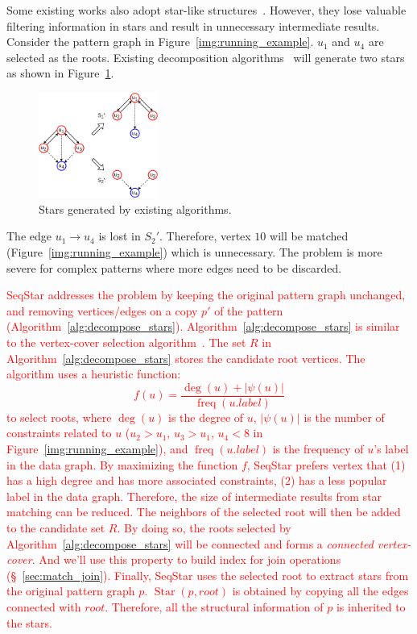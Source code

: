 
Some existing works also adopt star-like structures~\cite{DBLP:journals/pvldb/SunWWSL12,DBLP:journals/pvldb/LaiQLC15}. However, they lose valuable filtering information in stars and result in unnecessary intermediate results.
Consider the pattern graph in Figure~\ref{img:running_example}. $u_1$ and $u_4$ are selected as the roots.
Existing decomposition algorithms~\cite{DBLP:journals/pvldb/SunWWSL12,DBLP:journals/pvldb/LaiQLC15} will generate two stars as shown in Figure~\ref{img:stwig}.
\begin{figure}[ht]
  \centering
  \includegraphics[width=0.35\textwidth]{img/stwig.pdf}
  \caption{Stars generated by existing algorithms.}\label{img:stwig}
\end{figure}
The edge $u_1 \rightarrow u_4$ is lost in $S_2'$.
Therefore, vertex $10$ will be matched (Figure~\ref{img:running_example}) which is unnecessary.
The problem is more severe for complex patterns where more edges need to be discarded.

\textcolor{red}{SeqStar addresses the problem by keeping the original pattern graph unchanged, and removing vertices/edges on a copy $p'$ of the pattern (Algorithm~\ref{alg:decompose_stars}).
Algorithm~\ref{alg:decompose_stars} is similar to the vertex-cover selection algorithm~\cite{DBLP:books/daglib/0023376}.
The set $R$ in Algorithm~\ref{alg:decompose_stars} stores the candidate root vertices.
The algorithm uses a heuristic function: \[f(u) = \frac{\deg(u) + |\psi(u)|}{\operatorname{freq}(u.label)}\] to select roots,
where $\deg(u)$ is the degree of $u$, $|\psi(u)|$ is the number of constraints related to $u$ ($u_2 > u_1$, $u_3 > u_1$, $u_4 < 8$ in Figure~\ref{img:running_example}),
and $\operatorname{freq}(u.label)$ is the frequency of $u$'s label in the data graph.
By maximizing the function $f$,
SeqStar prefers vertex that
(1) has a high degree and has more associated constraints,
(2) has a less popular label in the data graph.
Therefore, the size of intermediate results from star matching can be reduced.
The neighbors of the selected root will then be added to the candidate set $R$.
By doing so, the roots selected by Algorithm~\ref{alg:decompose_stars} will be connected and forms a \emph{connected vertex-cover}.
And we'll use this property to build index for join operations (\S~\ref{sec:match_join}).
Finally, SeqStar uses the selected root to extract stars from the original pattern graph $p$.
$\operatorname{Star}(p, root)$ is obtained by copying all the edges connected with $root$.
Therefore, all the structural information of $p$ is inherited to the stars.}


